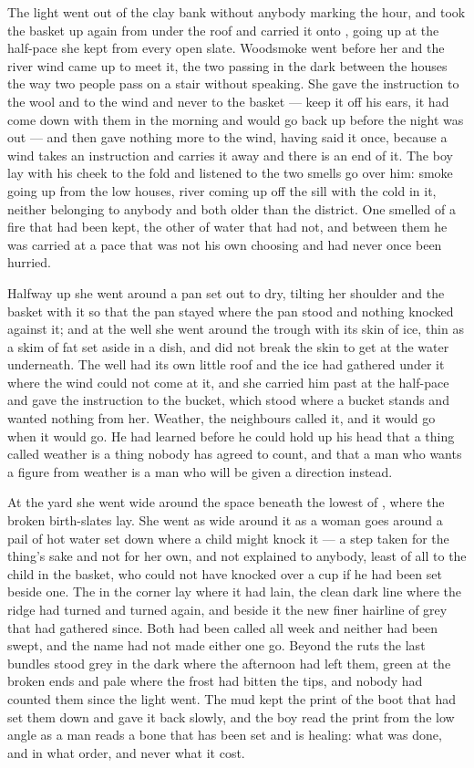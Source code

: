 The light went out of the clay bank without anybody marking the hour, and  took the basket up again from under the roof and carried it onto , going up at the half-pace she kept from every open slate. Woodsmoke went before her and the river wind came up to meet it, the two passing in the dark between the houses the way two people pass on a stair without speaking. She gave the instruction to the wool and to the wind and never to the basket --- keep it off his ears, it had come down with them in the morning and would go back up before the night was out --- and then gave nothing more to the wind, having said it once, because a wind takes an instruction and carries it away and there is an end of it. The boy lay with his cheek to the fold and listened to the two smells go over him: smoke going up from the low houses, river coming up off the sill with the cold in it, neither belonging to anybody and both older than the district. One smelled of a fire that had been kept, the other of water that had not, and between them he was carried at a pace that was not his own choosing and had never once been hurried.

Halfway up she went around a pan set out to dry, tilting her shoulder and the basket with it so that the pan stayed where the pan stood and nothing knocked against it; and at the well she went around the trough with its skin of ice, thin as a skim of fat set aside in a dish, and did not break the skin to get at the water underneath. The well had its own little roof and the ice had gathered under it where the wind could not come at it, and she carried him past at the half-pace and gave the instruction to the bucket, which stood where a bucket stands and wanted nothing from her. Weather, the neighbours called it, and it would go when it would go. He had learned before he could hold up his head that a thing called weather is a thing nobody has agreed to count, and that a man who wants a figure from weather is a man who will be given a direction instead.

At the yard she went wide around the space beneath the lowest of , where the broken birth-slates lay. She went as wide around it as a woman goes around a pail of hot water set down where a child might knock it --- a step taken for the thing's sake and not for her own, and not explained to anybody, least of all to the child in the basket, who could not have knocked over a cup if he had been set beside one. The  in the corner lay where it had lain, the clean dark line where the ridge had turned and turned again, and beside it the new finer hairline of grey that had gathered since. Both had been called  all week and neither had been swept, and the name had not made either one go. Beyond the ruts the last bundles stood grey in the dark where the afternoon had left them, green at the broken ends and pale where the frost had bitten the tips, and nobody had counted them since the light went. The mud kept the print of the boot that had set them down and gave it back slowly, and the boy read the print from the low angle as a man reads a bone that has been set and is healing: what was done, and in what order, and never what it cost.

